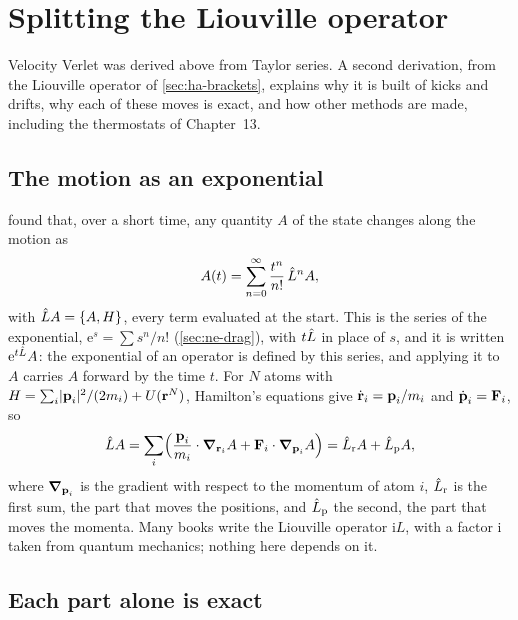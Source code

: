 \section{Splitting the Liouville operator}
\label{sec:in-splitting}

Velocity Verlet was derived above from Taylor series. A second derivation,
from the Liouville operator of \cref{sec:ha-brackets}, explains why it is
built of kicks and drifts, why each of these moves is exact, and how other
methods are made, including the thermostats of Chapter~13.

\subsection*{The motion as an exponential}

 found that, over a short time, any quantity $A$
of the state changes along the motion as
\begin{equation*}
   A(t) = \sum_{n=0}^{\infty}\frac{t^n}{n!}\,\hat{L}^nA ,
\end{equation*}
with $\hat{L} A = \{A, H\}$, every term evaluated at the start. This is the
series of the exponential, $\mathrm{e}^s = \sum s^n/n!$ (\cref{sec:ne-drag}),
with $t\hat{L}$ in place of $s$, and it is written $\mathrm{e}^{t\hat{L}}A$:
the exponential of an operator is defined by this series, and applying it
to $A$ carries $A$ forward by the time $t$. For $N$ atoms with $H =
\sum_i\lvert\bm{\mathrm{p}}_i\rvert^2/(2m_i) + U(\bm{\mathrm{r}}^N)$, Hamilton's equations
give $\dot{\bm{\mathrm{r}}}_i = \bm{\mathrm{p}}_i/m_i$ and $\dot{\bm{\mathrm{p}}}_i = \bm{\mathrm{F}}_i$, so
\begin{equation*}
   \hat{L} A = \sum_i\Bigl(\frac{\bm{\mathrm{p}}_i}{m_i}\cdot\bm{\nabla}_{\bm{\mathrm{r}}_i}A
   + \bm{\mathrm{F}}_i\cdot\bm{\nabla}_{\bm{\mathrm{p}}_i}A\Bigr) = \hat{L}_{\mathrm r}A
   + \hat{L}_{\mathrm p}A ,
\end{equation*}
where $\bm{\nabla}_{\bm{\mathrm{p}}_i}$ is the gradient with respect to the momentum of
atom $i$, $\hat{L}_{\mathrm r}$ is the first sum, the part that moves the
positions, and $\hat{L}_{\mathrm p}$ the second, the part that moves the
momenta. Many books write the Liouville operator $\mathrm{i}L$, with a
factor $\mathrm{i}$ taken from quantum mechanics; nothing here depends on
it.

\subsection*{Each part alone is exact}

